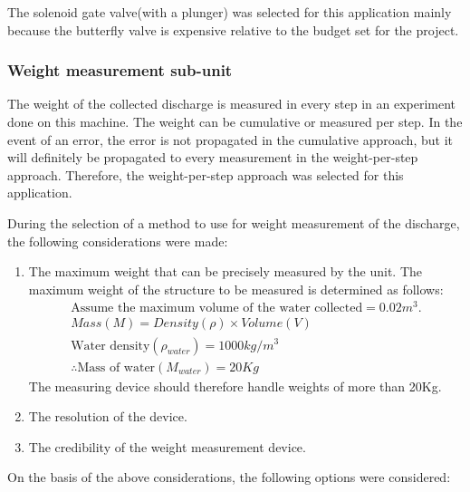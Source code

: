 The solenoid gate valve(with a plunger) was selected for this application mainly because the butterfly valve is expensive relative to the budget set for the project.

\subsubsection{Weight measurement sub-unit}
The weight of the collected discharge is measured in every step in an experiment done on this machine. The weight can be cumulative or measured per step. In the event of an error, the error is not propagated in the cumulative approach, but it will definitely be propagated to every measurement in the weight-per-step approach. Therefore, the weight-per-step approach was selected for this application.
\par
During the selection of a method to use for weight measurement of the discharge, the following considerations were made:
\begin{enumerate}
    \item The maximum weight that can be precisely measured by the unit. The maximum weight of the structure to be measured is determined as follows:\\
    \begin{align*}
    \text{Assume the maximum volume of the water collected} = 0.02m^{3}.\\
    Mass(M) = Density(\rho) \times Volume(V)\\
    \text{Water density} (\rho_{\textit{water}}) = 1000kg/m^{3}\\
    \therefore  \text{Mass of water} (M_{\textit{water}}) = 20 Kg
    \end{align*}
    The measuring device should therefore handle weights of more than 20Kg.
    \item The resolution of the device.
    \item The credibility of the weight measurement device.
\end{enumerate}
On the basis of the above considerations, the following options were considered:
